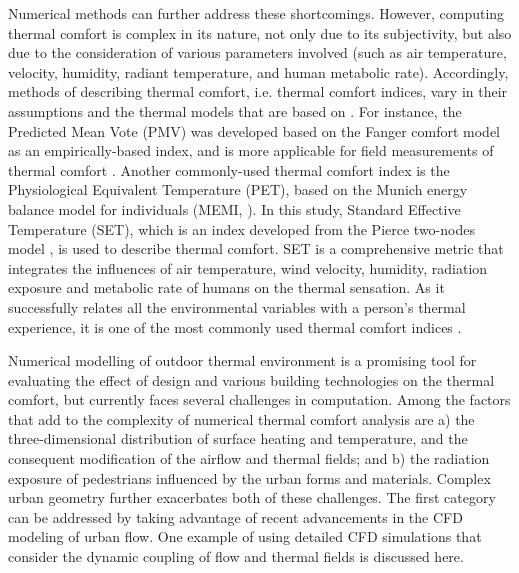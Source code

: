 \documentclass[smallextended]{svjour3}
\begin{document}
Numerical methods can further address these shortcomings. However, computing thermal comfort is complex in its nature, not only due to its subjectivity, but also due to the consideration of various parameters involved (such as air temperature, velocity, humidity, radiant temperature, and human metabolic rate). Accordingly, methods of describing thermal comfort, i.e. thermal comfort indices, vary in their assumptions and the thermal models that are based on \citep{gagge1971effective,azer1977,epstein2006thermal,honjo2009thermal}. For instance, the Predicted Mean Vote (PMV) was developed based on the Fanger comfort model \citep{fanger1967calculation, fanger1972thermal} as an empirically-based index, and is more applicable for field measurements of thermal comfort \citep{ye2003new}. Another commonly-used thermal comfort index is the Physiological Equivalent Temperature (PET), based on the Munich energy balance model for individuals (MEMI, \citet{honjo2009thermal}). In this study, Standard Effective Temperature (SET), which is an index developed from the Pierce two-nodes model \citep{oohori1984comparison}, is used to describe thermal comfort.  SET is a comprehensive metric that integrates the influences of air temperature, wind velocity, humidity,  radiation exposure and metabolic rate of humans on the thermal sensation. As it successfully relates all the environmental variables with a person’s thermal experience, it is one of the most commonly used thermal comfort indices \citep{ye2003new}. 

\begin{table}[!t]
  \begin{framed}
  \footnotesize
    \printnomenclature
  \end{framed}
\end{table}
Numerical modelling of outdoor thermal environment is a promising tool for evaluating the effect of design and various building technologies on the thermal comfort, but currently faces several challenges in computation.  Among the factors that add to the complexity of numerical thermal comfort analysis are a) the three-dimensional distribution of surface heating and temperature, and the consequent modification of the airflow and thermal fields; and b) the radiation exposure of pedestrians influenced by the urban forms and materials.  Complex urban geometry further exacerbates both of these challenges. The first category can be addressed by taking advantage of recent advancements in the CFD modeling of urban flow. One example of using detailed CFD simulations that consider the dynamic coupling of flow and thermal fields is discussed here. 
\end{document}
